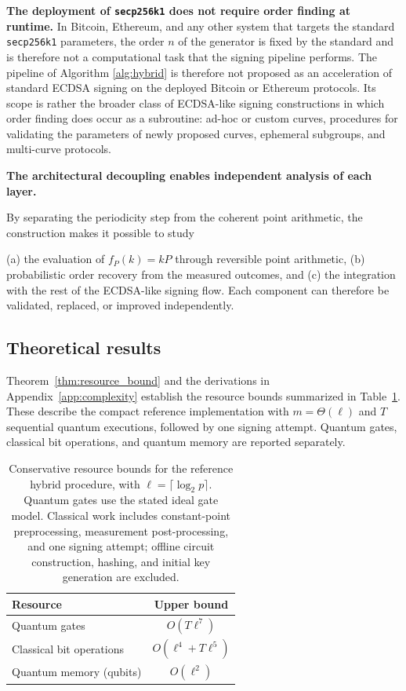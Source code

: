 \textbf{The deployment of \texttt{secp256k1} does not require order finding at runtime.} In Bitcoin, Ethereum, and any other system that targets the standard \texttt{secp256k1} parameters, the order $n$ of the generator is fixed by the standard \cite{SEC2_2010} and is therefore not a computational task that the signing pipeline performs. The pipeline of Algorithm \ref{alg:hybrid} is therefore not proposed as an acceleration of standard ECDSA signing on the deployed Bitcoin or Ethereum protocols. Its scope is rather the broader class of ECDSA-like signing constructions in which order finding does occur as a subroutine: ad-hoc or custom curves, procedures for validating the parameters of newly proposed curves, ephemeral subgroups, and multi-curve protocols. 

\textbf{The architectural decoupling enables independent analysis of each layer.} 

By separating the periodicity step from the coherent point arithmetic, the construction makes it possible to study \begin{revision} (a) the evaluation of $f_P(k)=kP$ through reversible point arithmetic, (b) probabilistic order recovery from the measured outcomes, and (c) the integration with the rest of the ECDSA-like signing flow. Each component can therefore be validated, replaced, or improved independently.
\end{revision}

\subsection{Theoretical results}

\begin{revision}
Theorem~\ref{thm:resource_bound} and the derivations in Appendix~\ref{app:complexity} establish the resource bounds summarized in Table~\ref{tab:complexity}. These describe the compact reference implementation with $m=\Theta(\ell)$ and $T$ sequential quantum executions, followed by one signing attempt. Quantum gates, classical bit operations, and quantum memory are reported separately.
\end{revision}

\begin{table}[t]
    \color{blue}
    \centering
    \small
    \caption{Conservative resource bounds for the reference hybrid procedure, with $\ell=\lceil\log_2p\rceil$. Quantum gates use the stated ideal gate model. Classical work includes constant-point preprocessing, measurement post-processing, and one signing attempt; offline circuit construction, hashing, and initial key generation are excluded.}
    \label{tab:complexity}
    \begin{tabular}{lc}
        \hline
        Resource & Upper bound \\
        \hline
        Quantum gates & $O(T\ell^7)$ \\
        Classical bit operations & $O(\ell^4+T\ell^5)$ \\
        Quantum memory (qubits) & $O(\ell^2)$ \\
        \hline
    \end{tabular}
\end{table}

